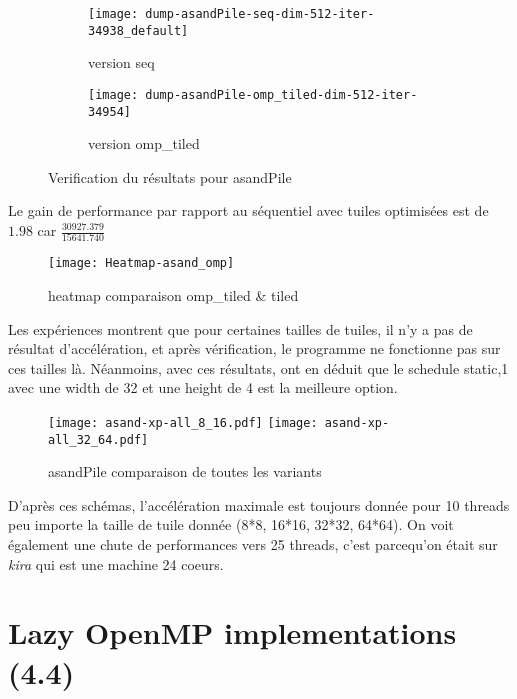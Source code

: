 \documentclass[10pt, a4paper]{article}
\begin{document}
\begin{figure}[H]
    \centering
    \begin{subfigure}{.4\textwidth}
        \texttt{[image: dump-asandPile-seq-dim-512-iter-34938\_default]}
        \caption{\small{version seq}}
    \end{subfigure}
    \begin{subfigure}{.4\textwidth}
        \texttt{[image: dump-asandPile-omp\_tiled-dim-512-iter-34954]}
        \caption{\small{version omp\_tiled}}
    \end{subfigure}
    \caption{Verification du résultats pour asandPile}
\end{figure}

Le gain de performance par rapport au séquentiel avec tuiles optimisées est de $1.98$ car $\frac{30927.379}{15641.740}$

\begin{figure}[H]
    \centering
    \texttt{[image: Heatmap-asand\_omp]}
    \caption{\small{heatmap comparaison omp\_tiled \& tiled}}
\end{figure}

Les expériences montrent que pour certaines tailles de tuiles, il n'y a pas de résultat d'accélération, et après vérification, le programme ne fonctionne pas sur ces tailles là.
Néanmoins, avec ces résultats, ont en déduit que le schedule static,1 avec une width de 32 et une height de 4 est la meilleure option.

\begin{figure}[H]
    \centering
    \texttt{[image: asand-xp-all\_8\_16.pdf]}
    \texttt{[image: asand-xp-all\_32\_64.pdf]}
    \caption{\small{asandPile comparaison de toutes les variants}}
\end{figure}

D'après ces schémas, l'accélération maximale est toujours donnée pour 10 threads peu importe la taille de tuile donnée (8*8, 16*16, 32*32, 64*64). 
On voit également une chute de performances vers 25 threads, c'est parcequ'on était sur \emph{kira} qui est une machine 24 coeurs.


\section{Lazy OpenMP implementations (4.4)}
\end{document}
